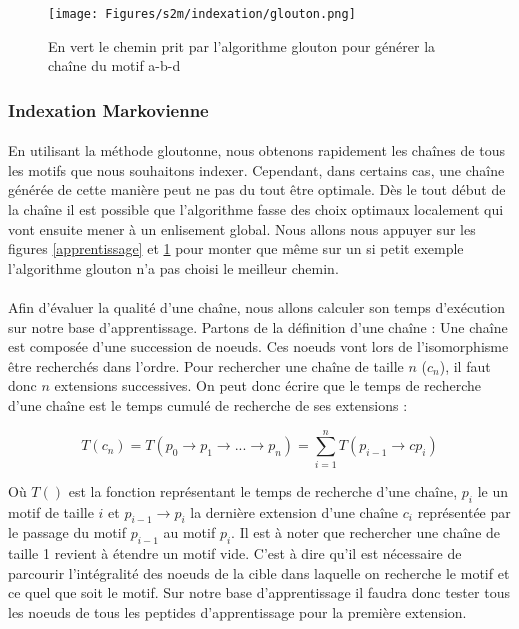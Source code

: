 \documentclass[12pt,french,twoside]{report}
\begin{document}
\begin{figure}
  \texttt{[image: Figures/s2m/indexation/glouton.png]}
  \caption{\label{glouton}En vert le chemin prit par l'algorithme glouton pour générer la chaîne du motif a-b-d}
\end{figure}

\subsubsection{Indexation Markovienne}

\paragraph{}En utilisant la méthode gloutonne, nous obtenons rapidement les chaînes de tous les motifs que nous
souhaitons indexer. Cependant, dans certains cas, une chaîne générée de cette manière peut ne pas du tout être optimale.
Dès le tout début de la chaîne il est possible que l'algorithme fasse des choix optimaux localement qui vont ensuite mener à un
enlisement global. Nous allons nous appuyer sur les figures \ref{apprentissage} et \ref{glouton} pour monter que même sur un si
petit exemple l'algorithme glouton n'a pas choisi le meilleur chemin.

\paragraph{}Afin d'évaluer la qualité d'une chaîne, nous allons calculer son temps d'exécution sur notre base d'apprentissage.
Partons de la définition d'une chaîne : Une chaîne est composée d'une succession de noeuds. Ces noeuds vont lors de l'isomorphisme
être recherchés dans l'ordre. Pour rechercher une chaîne de taille $n$ ($c_n$), il faut donc $n$ extensions successives. On
peut donc écrire que le temps de recherche d'une chaîne est le temps cumulé de recherche de ses extensions :

\begin{equation}
 T(c_n) = T(p_0 \rightarrow p_1 \rightarrow ... \rightarrow p_n) = \sum_{i=1}^n T(p_{i-1} \rightarrow cp_i)
\end{equation}

Où $T()$ est la fonction représentant le temps de recherche d'une chaîne, $p_i$ le un motif de taille $i$ et $p_{i-1} \rightarrow
p_i$ la dernière extension d'une chaîne $c_i$ représentée par le passage du motif $p_{i-1}$ au motif $p_i$. Il est à noter que
rechercher une chaîne de taille 1 revient à étendre un motif vide. C'est à dire qu'il est nécessaire de parcourir l'intégralité
des noeuds de la cible dans laquelle on recherche le motif et ce quel que soit le motif. Sur notre base d'apprentissage il faudra
donc tester tous les noeuds de tous les peptides d'apprentissage pour la première extension.
\end{document}
